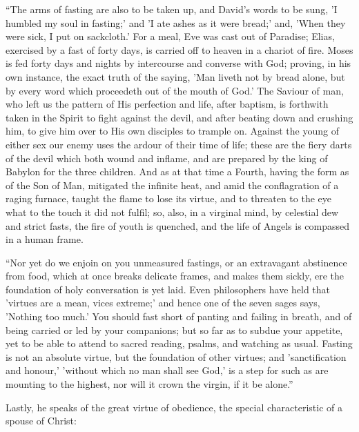 ``The arms of fasting are also to be taken up, and David's
words to be sung, 'I humbled my soul in fasting;' and 'I ate ashes as
it were bread;' and, 'When they were sick, I put on sackcloth.' For a
meal, Eve was cast out of Paradise; Elias, exercised by a fast of
forty days, is carried off to heaven in a chariot of fire. Moses is
fed forty days and nights by intercourse and converse with God;
proving, in his own instance, the exact truth of the saying, 'Man
liveth not by bread alone, but by every word which proceedeth out of
the mouth of God.' The Saviour of man, who left us the pattern of His
perfection and life, after baptism, is forthwith taken in the Spirit
to fight against the devil, and after beating down and crushing him,
to give him over to His own disciples to trample on. Against the young
of either sex our enemy uses the ardour of their time of life; these
are the fiery darts of the devil which both wound and inflame, and are
prepared by the king of Babylon for the three children. And as at that
time a Fourth, having the form as of the Son of Man, mitigated the
infinite heat, and amid the conflagration of a raging furnace, taught
the flame to lose its virtue, and to threaten to the eye what to the
touch it did not fulfil; so, also, in a virginal mind, by celestial
dew and strict fasts, the fire of youth is quenched, and the life of
Angels is compassed in a human frame.

``Nor yet do we enjoin on you unmeasured fastings, or an
extravagant abstinence from food, which at once breaks delicate
frames, and makes them sickly, ere the foundation of holy conversation
is yet laid. Even philosophers have held that 'virtues are a mean,
vices extreme;' and hence one of the seven sages says, 'Nothing too
much.' You should fast short of panting and failing in breath, and of
being carried or led by your companions; but so far as to subdue your
appetite, yet to be able to attend to sacred reading, psalms, and
watching as usual. Fasting is not an absolute virtue, but the
foundation of other virtues; and 'sanctification and honour,' 'without
which no man shall see God,' is a step for such as are mounting to the
highest, nor will it crown the virgin, if it be alone.''

Lastly, he speaks of the great virtue of obedience, the special
characteristic of a spouse of Christ:

